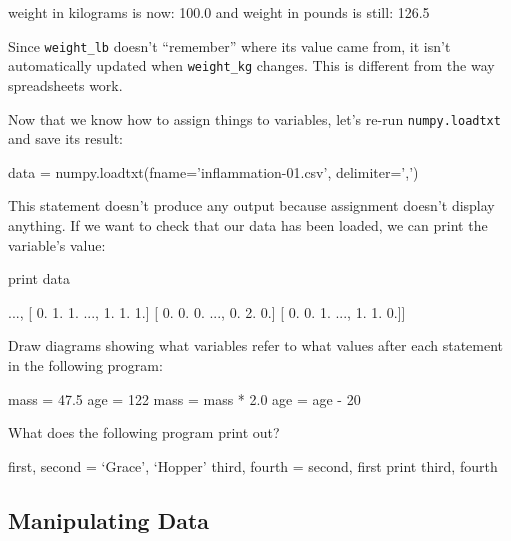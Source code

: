 \begin{VerbOut}
weight in kilograms is now: 100.0 and weight in pounds is still: 126.5
\end{VerbOut}


Since \texttt{weight\_lb} doesn't ``remember'' where its value came
from, it isn't automatically updated when \texttt{weight\_kg} changes.
This is different from the way spreadsheets work.

Now that we know how to assign things to variables, let's re-run
\texttt{numpy.loadtxt} and save its result:

\begin{VerbIn}
data = numpy.loadtxt(fname='inflammation-01.csv', delimiter=',')
\end{VerbIn}

This statement doesn't produce any output because assignment doesn't
display anything. If we want to check that our data has been loaded, we
can print the variable's value:

\begin{VerbIn}
print data
\end{VerbIn}

\begin{VerbOut}
[[ 0.  0.  1. ...,  3.  0.  0.]
 [ 0.  1.  2. ...,  1.  0.  1.]
 [ 0.  1.  1. ...,  2.  1.  1.]
 ...,
 [ 0.  1.  1. ...,  1.  1.  1.]
 [ 0.  0.  0. ...,  0.  2.  0.]
 [ 0.  0.  1. ...,  1.  1.  0.]]
\end{VerbOut}

\begin{challenge}
  Draw diagrams showing what variables refer to what values after each
  statement in the following program:

\begin{VerbIn}
mass = 47.5
age = 122
mass = mass * 2.0
age = age - 20
\end{VerbIn}
\end{challenge}

\begin{challenge}
  What does the following program print out?
\begin{VerbIn}
first, second = `Grace', `Hopper'
third, fourth = second, first
print third, fourth
\end{VerbIn}
\end{challenge}

\subsection{Manipulating Data}

